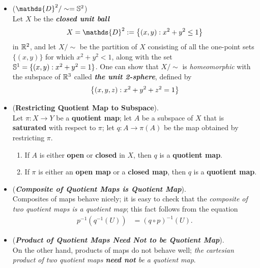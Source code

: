 \documentclass[11pt]{article}
\begin{document}
\begin{itemize}
\item \begin{example} ($\mathds{D}^2/\sim =  \bS^2$)\\
Let $X$ be the \emph{\textbf{closed unit ball}}
\begin{align*}
X = \mathds{D}^2 := \set{(x, y): x^2 + y^2 \le 1}
\end{align*}
in ${\mathbb R}^2$, and let $X/\sim$ be the partition of $X$ consisting of all the one-point sets $\{(x, y)\}$ for
which $x^2 + y^2 < 1$, along with the set ${\mathbb S}^1 = \{(x,y): x^2 + y^2 = 1\}$. One can show that $X/\sim$ is \emph{homeomorphic} with the subspace of ${\mathbb R}^3$ called \emph{\textbf{the unit 2-sphere}}, defined by
\begin{align*}
\left\{(x, y, z): x^2 + y^2 + z^2 = 1\right\}
\end{align*}
\end{example}


\item \begin{proposition} (\textbf{Restricting Quotient Map to Subspace}). \citep{munkres2000topology}\\
Let $\pi : X \rightarrow Y$ be a \textbf{quotient map}; let $A$ be a subspace of $X$ that is \textbf{saturated} with respect to $\pi$; let $q : A \rightarrow \pi(A)$ be the map obtained by restricting $\pi$.
\begin{enumerate}
\item If $A$ is either \textbf{open} or \textbf{closed} in $X$, then $q$ is a \textbf{quotient map}.
\item If $\pi$ is either an \textbf{open map} or a \textbf{closed map}, then $q$ is a \textbf{quotient map}.
\end{enumerate}
\end{proposition}

\item \begin{remark} (\textbf{\emph{Composite of Quotient Maps is Quotient Map}}). \\
Composites of maps  behave nicely; it is easy to check that the \emph{composite of two quotient maps is a quotient map}; this fact follows from the equation
\begin{align*}
p^{-1}(q^{-1}(U)) &= (q\circ p)^{-1}(U).
\end{align*}
\end{remark}

\item \begin{remark} (\textbf{\emph{Product of Quotient Maps Need Not to be Quotient Map}}). \\
On the other hand, products of maps do not behave well; \emph{the cartesian product of two quotient maps \textbf{need not} be a quotient map}. 


\end{remark}
\end{itemize}
\end{document}
